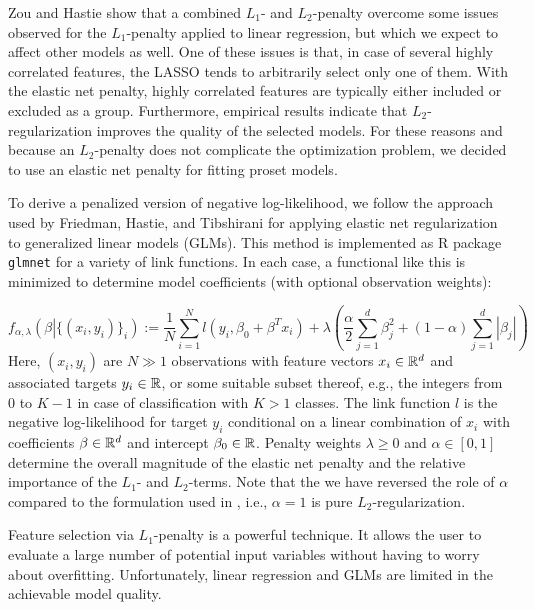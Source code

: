 %
Zou and Hastie \cite{Zou_05} show that a combined $L_1$- and $L_2$-penalty overcome some issues observed for the $L_1$-penalty applied to linear regression, but which we expect to affect other models as well.
One of these issues is that, in case of several highly correlated features, the LASSO tends to arbitrarily select only one of them.
With the elastic net penalty, highly correlated features are typically either included or excluded as a group.
Furthermore, empirical results indicate that $L_2$-regularization improves the quality of the selected models.
For these reasons and because an $L_2$-penalty does not complicate the optimization problem, we decided to use an elastic net penalty for fitting proset models.\par
%
To derive a penalized version of negative log-likelihood, we follow the approach used by Friedman, Hastie, and Tibshirani \cite{Friedman_10} for applying elastic net regularization to generalized linear models (GLMs).
This method is implemented as R package \texttt{glmnet} \cite{Friedman_10} for a variety of link functions.
In each case, a functional like this is minimized to determine model coefficients (with optional observation weights):\par
%
\begin{equation}
f_{\alpha,\lambda}\left(\beta\left|\{(x_i,y_i)\}_i\right.\right):=\frac{1}{N}\sum_{i=1}^Nl(y_i,\beta_0+\beta^Tx_i)+\lambda\left(\frac{\alpha}{2}\sum_{j=1}^d\beta_j^2+(1-\alpha)\sum_{j=1}^d|\beta_j|\right)\label{eq_regularization}
\end{equation}
%
Here, $(x_i,y_i)$ are $N\gg1$ observations with feature vectors $x_i\in\mathbb{R}^d$ and associated targets $y_i\in\mathbb{R}$, or some suitable subset thereof, e.g., the integers from $0$ to $K-1$ in case of classification with $K>1$ classes.
The link function $l$ is the negative log-likelihood for target $y_i$ conditional on a linear combination of $x_i$ with coefficients $\beta\in\mathbb{R}^d$ and intercept $\beta_0\in\mathbb{R}$.
Penalty weights $\lambda\geq0$ and $\alpha\in[0,1]$ determine the overall magnitude of the elastic net penalty and the relative importance of the $L_1$- and $L_2$-terms.
Note that the we have reversed the role of $\alpha$ compared to the formulation used in \cite{Friedman_10}, i.e., $\alpha=1$ is pure $L_2$-regularization.\par
%
Feature selection via $L_1$-penalty is a powerful technique.
It allows the user to evaluate a large number of potential input variables without having to worry about overfitting.
Unfortunately, linear regression and GLMs are limited in the achievable model quality.
